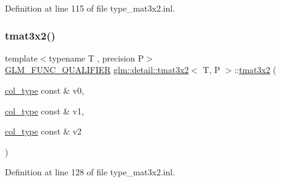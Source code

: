 Definition at line 115 of file type\+\_\+mat3x2.\+inl.

\mbox{\label{structglm_1_1detail_1_1tmat3x2_af83457c3dde2ca170e71eed84c60338c}} 
\subsubsection{\texorpdfstring{tmat3x2()}{tmat3x2()}\hspace{0.1cm}{\footnotesize\ttfamily [7/22]}}
{\footnotesize\ttfamily template$<$typename T , precision P$>$ \\
\hyperlink{setup_8hpp_a33fdea6f91c5f834105f7415e2a64407}{G\+L\+M\+\_\+\+F\+U\+N\+C\+\_\+\+Q\+U\+A\+L\+I\+F\+I\+ER} \hyperlink{structglm_1_1detail_1_1tmat3x2}{glm\+::detail\+::tmat3x2}$<$ T, P $>$\+::\hyperlink{structglm_1_1detail_1_1tmat3x2}{tmat3x2} (\begin{DoxyParamCaption}\item[{\hyperlink{structglm_1_1detail_1_1tmat3x2_a9c0f2cfe8e359b2917b5f616a5dbc9e4}{col\+\_\+type} const \&}]{v0,  }\item[{\hyperlink{structglm_1_1detail_1_1tmat3x2_a9c0f2cfe8e359b2917b5f616a5dbc9e4}{col\+\_\+type} const \&}]{v1,  }\item[{\hyperlink{structglm_1_1detail_1_1tmat3x2_a9c0f2cfe8e359b2917b5f616a5dbc9e4}{col\+\_\+type} const \&}]{v2 }\end{DoxyParamCaption})}



Definition at line 128 of file type\+\_\+mat3x2.\+inl.

\mbox{\label{structglm_1_1detail_1_1tmat3x2_a775df36ef9146cd819095a1ffa971558}} 
